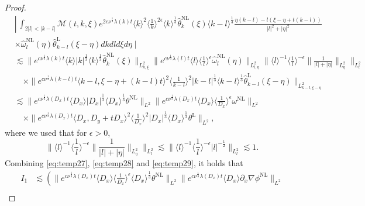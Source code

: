 \documentclass[reqno, 12pt]{amsart} %
\theoremstyle{plain} %
\theoremstyle{definition}
\theoremstyle{remark}
\numberwithin{equation}{section} %
\newcommand{\no}{\nonumber}
\newcommand{\lt}{\left}
\newcommand{\rt}{\right}
\begin{document}
\begin{proof}
\begin{align}
			\no& \left\lvert\, \int_{2|l|<|k-l|} \mathcal{M}(t, k, \xi) e^{2 c \nu^{\frac{1}{3}} \lambda(k) t}\langle k\rangle^2\langle\frac{1}{k}\rangle^{2 \epsilon} \langle k \rangle^\frac13\hat{\theta}_k^{\mathrm{NL}}(\xi) \langle k-l \rangle^\frac13  \frac{\eta(k-l)-l(\xi-\eta+t(k-l))}{|l|^2+|\eta|^2}\right.\no \\\no
			& \times \hat{\omega}_l^{\mathrm{NL}}(\eta) \hat{\theta}_{k-l}^{\mathrm{L}}(\xi-\eta) d k d l d \xi d \eta \mid \\\no
			& \lesssim\|e^{c \nu^{\frac{1}{3}} \lambda(k) t}\langle k\rangle|k|^{\frac{1}{3}} \langle k \rangle^\frac13  \hat{\theta}_k^{\mathrm{NL}}(\xi)\|_{L_{k, \xi}^2}\|e^{c \nu^{\frac{1}{3}} \lambda(l) t}\langle l\rangle\langle\frac{1}{l}\rangle^\epsilon \hat{\omega}_l^{\mathrm{NL}}(\eta)\|_{L_{l, \eta}^2}\|\langle l\rangle^{-1}\langle\frac{1}{l}\rangle^{-\epsilon}\| \frac{1}{|l|+|\eta|}\|_{L_\eta^2}\|_{L_l^2} \\\no
			& \quad \times\|e^{c \nu^{\frac{1}{3}} \lambda(k-l) t}\langle k-l, \xi-\eta+(k-l) t\rangle^2\langle\frac{1}{k-l}\rangle^2|k-l|^{\frac{1}{3}} \langle k-l \rangle^\frac13 \hat{\theta}_{k-l}^{\mathrm{L}}(\xi-\eta)\|_{L_{k-l, \xi-\eta}^2} \\\no
			& \lesssim\|e^{c \nu^{\frac{1}{3}} \lambda\left(D_x\right) t}\langle D_x\rangle\left|D_x\right|^{\frac{1}{3}} \langle D_x \rangle^\frac13  \theta^{\mathrm{NL}}\|_{L^2}\|e^{c \nu^{\frac{1}{3}} \lambda\left(D_x\right) t}\langle D_x\rangle\langle\frac{1}{D_x}\rangle^\epsilon \omega^{\mathrm{NL}}\|_{L^2} \\
			& \quad \times\|e^{c \nu^{\frac{1}{3}} \lambda\left(D_x\right) t}\langle D_x, D_y+t D_x\rangle^2\langle\frac{1}{D_x}\rangle^2\left|D_x\right|^{\frac{1}{3}} \langle D_x \rangle^\frac13  \theta^{\mathrm{L}}\|_{L^2},
		\end{align}
		where we used that for $\epsilon>0$,
		$$
		\|\langle l\rangle^{-1}\langle\frac{1}{l}\rangle^{-\epsilon}\| \frac{1}{|l|+|\eta|}\|_{L_\eta^2}\|_{L_l^2} \lesssim\|\langle l\rangle^{-1}\langle\frac{1}{l}\rangle^{-\epsilon}|l|^{-\frac{1}{2}}\|_{L_l^2} \lesssim 1 .
		$$
		Combining \eqref{eq:temp27}, \eqref{eq:temp28} and \eqref{eq:temp29}, it holds that
		\begin{equation}\begin{aligned}  \label{eq:est of I1}
				I_1 &\lesssim  \lt( \|e^{c \nu^{\frac{1}{3}} \lambda\left(D_x\right) t}\langle D_x\rangle  \langle\frac{1}{D_x}\rangle^\epsilon \langle D_x \rangle^\frac13  \theta^{\mathrm{NL}}\|_{L^2}\|e^{c \nu^{\frac{1}{3}} \lambda\left(D_x\right) t}\langle D_x\rangle \partial_x \nabla \phi^{\mathrm{NL}}\|_{L^2} \rt. \\

\end{aligned}
\end{equation}
\end{proof}
\end{document}

